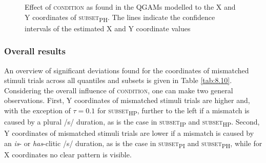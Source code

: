 \begin{figure}
    \centering
    
    \caption{Effect of \textsc{condition} as found in the QGAMs modelled to the X and Y coordinates of \textsc{subset\textsubscript{PH}}. The lines indicate the confidence intervals of the estimated X and Y coordinate values}
    \label{fig:8_6}
\end{figure}

\subsubsection{Overall results}\label{section08_2_2_5}

An overview of significant deviations found for the coordinates of mismatched stimuli trials across all quantiles and subsets is given in Table \ref{tab:8.10}. Considering the overall influence of \textsc{condition}, one can make two general observations. First, Y coordinates of mismatched stimuli trials are higher and, with the exception of $\tau=0.1$ for \textsc{subset\textsubscript{HP}}, further to the left if a mismatch is caused by a plural /s/ duration, as is the case in \textsc{subset\textsubscript{IP}} and \textsc{subset\textsubscript{HP}}. Second, Y coordinates of mismatched stimuli trials are lower if a mismatch is caused by an \textit{is}- or \textit{has}-clitic /s/ duration, as is the case in \textsc{subset\textsubscript{PI}} and \textsc{subset\textsubscript{PH}}, while for X coordinates no clear pattern is visible.

